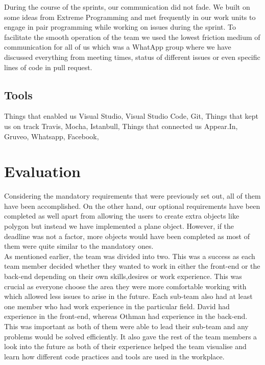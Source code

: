 \documentclass[a4paper]{report}
\begin{document}
	During the course of the sprints, our communication did not fade. We built on some ideas from Extreme Programming and met frequently in our work units to engage in pair programming while working on issues during the sprint. To facilitate the smooth operation of the team we used the lowest friction medium of communication for all of us which was a WhatApp group where we have discussed everything from meeting times, status of different issues or even specific lines of code in pull request. 
	
	\section{Tools}
	
	Things that enabled us
	Visual Studio, Visual Studio Code, Git,
	Things that kept us on track
	Travis, Mocha, Istanbull,
	Things that connected us
	Appear.In, Gruveo, Whatsapp, Facebook,
	
	
	\chapter{Evaluation}
	Considering the mandatory requirements that were previously set out, all of them have been accomplished.
	On the other hand, our optional requirements have been
	completed as well apart from allowing the users to create extra objects like polygon but instead we have implemented a plane object. However, if the deadline was not a factor, more objects would have been completed as most of them were quite similar to the mandatory ones. \\
	
	As mentioned earlier, the team was divided into two. This was a success as each team member decided whether they wanted to work in either the front-end or the back-end depending on their own skills,desires or work experience. This was crucial as everyone choose the area they were more comfortable working with which allowed less issues to arise in the future. Each sub-team also had at least one member who had work experience in the particular field. David had experience in the front-end, whereas Othman had experience in the back-end. This was important as both of them were able to lead their sub-team and any problems would be solved efficiently. It also gave the rest of the team members a look into the future as both of their experience helped the team visualise and learn how different code practices and tools are used in the workplace.\\
	
\end{document}

